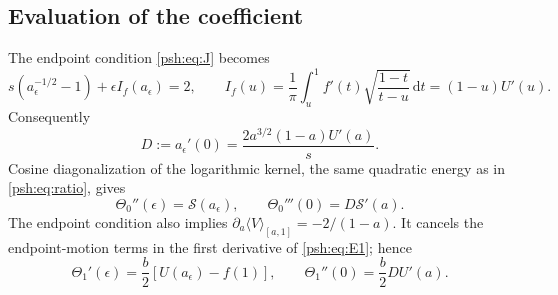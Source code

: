 \documentclass[11pt,a4paper]{article}
\numberwithin{equation}{section}
\theoremstyle{remark}\newtheorem{remark}[theorem]{Remark}
\newcommand{\dd}{\,\mathrm d}
\begin{document}
\subsection{Evaluation of the coefficient}\label{psh:sec:c1algebra}
The endpoint condition \eqref{psh:eq:J} becomes
\begin{equation}\label{psh:eq:endpointeps}
 s(a_\epsilon^{-1/2}-1)+\epsilon I_f(a_\epsilon)=2,
 \qquad
 I_f(u)=\frac1\pi\int_u^1 f'(t)\sqrt{\frac{1-t}{t-u}}\dd t
       =(1-u)U'(u).
\end{equation}
Consequently
\begin{equation}\label{psh:eq:D}
 D:=a_\epsilon'(0)=\frac{2a^{3/2}(1-a)U'(a)}s.
\end{equation}
Cosine diagonalization of the logarithmic kernel, the same quadratic
energy as in \eqref{psh:eq:ratio}, gives
\[
 \Theta_0''(\epsilon)=\mathcal S(a_\epsilon),\qquad
 \Theta_0'''(0)=D\mathcal S'(a).
\]
The endpoint condition also implies
$\partial_a\langle V\rangle_{[a,1]}=-2/(1-a)$.
It cancels the endpoint-motion terms in the first derivative of
\eqref{psh:eq:E1}; hence
\begin{equation}\label{psh:eq:E1diff}
 \Theta_1'(\epsilon)=\frac b2[U(a_\epsilon)-f(1)],\qquad
 \Theta_1''(0)=\frac b2DU'(a).
\end{equation}
\end{document}
